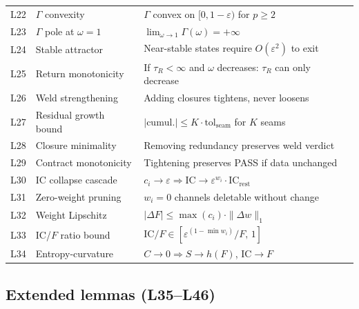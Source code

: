 \documentclass[
  aps,
  prd,
  twocolumn,
  superscriptaddress,
  nofootinbib,
  floatfix
]{revtex4-2}
\newcommand{\tR}{\tau_{\!R}}
\newcommand{\Gam}{\Gamma}
\newcommand{\eps}{\varepsilon}
\newcommand{\tolseam}{\mathrm{tol}_{\mathrm{seam}}}
\newcommand{\IC}{\mathrm{IC}}
\begin{document}
\begin{center}
{\begin{tabular}{@{}clp{4.0cm}@{}}
L22 & $\Gam$ convexity & $\Gam$ convex on $[0, 1{-}\eps)$ for $p \geq 2$ \\
L23 & $\Gam$ pole at $\omega = 1$ & $\lim_{\omega\to1}\Gam(\omega) = +\infty$ \\
L24 & Stable attractor & Near-stable states require $O(\eps^2)$ to exit \\
L25 & Return monotonicity & If $\tR < \infty$ and $\omega$ decreases: $\tR$ can only decrease \\
L26 & Weld strengthening & Adding closures tightens, never loosens \\
L27 & Residual growth bound & $|\text{cumul.}| \leq K \cdot \tolseam$ for $K$ seams \\
L28 & Closure minimality & Removing redundancy preserves weld verdict \\
L29 & Contract monotonicity & Tightening preserves PASS if data unchanged \\
L30 & IC collapse cascade & $c_i \to \eps \Longrightarrow \IC \to \eps^{w_i} \cdot \IC_\mathrm{rest}$ \\
L31 & Zero-weight pruning & $w_i = 0$ channels deletable without change \\
L32 & Weight Lipschitz & $|\Delta F| \leq \max(c_i) \cdot \|\Delta w\|_1$ \\
L33 & IC/$F$ ratio bound & $\IC/F \in [\eps^{(1-\min w_i)}/F, \, 1]$ \\
L34 & Entropy-curvature & $C \to 0 \Longrightarrow S \to h(F)$, $\IC \to F$ \\
\bottomrule
\end{tabular}}
\end{center}

\subsection{Extended lemmas (L35--L46)}
\end{document}

